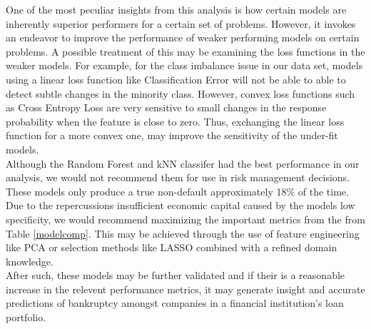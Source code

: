 \documentclass[12pt]{report}
\begin{document}
One of the most peculiar insights from this analysis is how certain models are inherently superior performers for a certain set of problems. However, it invokes an endeavor to improve the performance of weaker performing models on certain problems. A possible treatment of this may be examining the loss functions in the weaker models. For example, for the class imbalance issue in our data set, models using a linear loss function like Classification Error will not be able to able to detect subtle changes in the minority class. However, convex loss functions such as Cross Entropy Loss are very sensitive to small changes in the response probability when the feature is close to zero. Thus, exchanging the linear loss function for a more convex one, may improve the sensitivity of the under-fit models. \\ 
\indent Although the Random Forest and kNN classifer had the best performance in our analysis, we would not recommend them for use in risk management decisions. These models only produce a true non-default approximately 18\% of the time. Due to the repercussions insufficient economic capital caused by the models low specificity, we would recommend maximizing the important metrics from the from Table \ref{modelcomp}. This may be achieved through the use of feature engineering like PCA or selection methods like LASSO combined with a refined domain knowledge. \\
\indent After such, these models may be further validated and if their is a reasonable increase in the relevent performance metrics, it may generate insight and accurate predictions of bankruptcy amongst companies in a financial institution's loan portfolio. 
\end{document}
